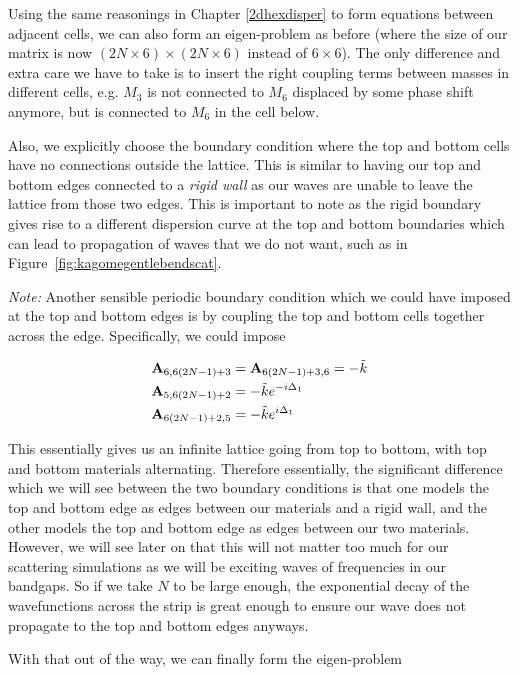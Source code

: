 Using the same reasonings in Chapter \ref{2dhexdisper} to form equations
between adjacent cells, we can also form an eigen-problem as before (where the
size of our matrix is now $(2N \times 6) \times (2N \times 6)$ instead of $6
\times 6$). The only difference and extra care we have to take is to insert the
right coupling terms between masses in different cells, e.g. $M_3$ is not
connected to $M_6$ displaced by some phase shift anymore, but is connected to
$M_6$ in the cell below. 

Also, we explicitly choose the boundary condition where the top and bottom
cells have no connections outside the lattice. This is similar to having our
top and bottom edges connected to a \textit{rigid wall} as our waves are unable
to leave the lattice from those two edges. This is important to note as the
rigid boundary gives rise to a different dispersion curve at the top and bottom
boundaries which can lead to propagation of waves that we do not want, such as
in Figure~\ref{fig:kagomegentlebendscat}.

\textit{Note:} Another sensible periodic boundary condition which we could have
imposed at the top and bottom edges is by coupling the top and bottom cells
together across the edge. Specifically, we could impose

\begin{align}
  \mathbf{A}_{6,6(2N-1)+3}&=\mathbf{A}_{6(2N-1)+3,6}=-\tilde{k} \\
  \mathbf{A}_{5,6(2N-1)+2}&=-\tilde{k}e^{-i\Delta_1} \\
  \mathbf{A}_{6(2N-1)+2,5}&=-\tilde{k}e^{i\Delta_1} 
\end{align}

This essentially gives us an infinite lattice going from top to bottom, with
top and bottom materials alternating. Therefore essentially, the significant
difference which we will see between the two boundary conditions is that one
models the top and bottom edge as edges between our materials and a rigid wall,
and the other models the top and bottom edge as edges between our two
materials. However, we will see later on that this will not matter too much for
our scattering simulations as we will be exciting waves of frequencies in our
bandgaps. So if we take $N$ to be large enough, the exponential decay of the
wavefunctions across the strip is great enough to ensure our wave does not
propagate to the top and bottom edges anyways.

With that out of the way, we can finally form the eigen-problem

